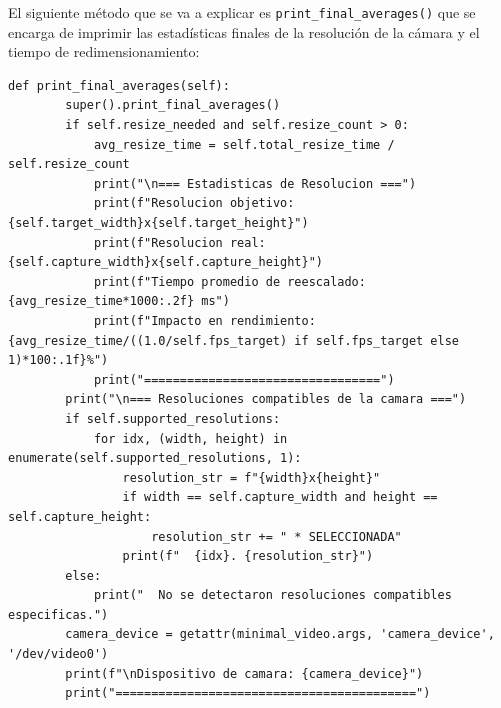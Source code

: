 El siguiente método que se va a explicar es \texttt{print\_final\_averages()} que se encarga de imprimir las estadísticas finales de la resolución de la cámara y el tiempo de redimensionamiento:
\begin{lstlisting}[style=pythonstyle, caption={Método \texttt{print\_final\_averages()} de \textit{Minimal\_Video\_Resolution\_verbose}.}, label={lst:print_final_averages}]
def print_final_averages(self):
        super().print_final_averages()
        if self.resize_needed and self.resize_count > 0:
            avg_resize_time = self.total_resize_time / self.resize_count
            print("\n=== Estadisticas de Resolucion ===")
            print(f"Resolucion objetivo: {self.target_width}x{self.target_height}")
            print(f"Resolucion real: {self.capture_width}x{self.capture_height}")
            print(f"Tiempo promedio de reescalado: {avg_resize_time*1000:.2f} ms")
            print(f"Impacto en rendimiento:        {avg_resize_time/((1.0/self.fps_target) if self.fps_target else 1)*100:.1f}%")
            print("=================================")
        print("\n=== Resoluciones compatibles de la camara ===")
        if self.supported_resolutions:
            for idx, (width, height) in enumerate(self.supported_resolutions, 1):
                resolution_str = f"{width}x{height}"
                if width == self.capture_width and height == self.capture_height:
                    resolution_str += " * SELECCIONADA"
                print(f"  {idx}. {resolution_str}")
        else:
            print("  No se detectaron resoluciones compatibles especificas.")
        camera_device = getattr(minimal_video.args, 'camera_device', '/dev/video0')
        print(f"\nDispositivo de camara: {camera_device}")
        print("==========================================")
\end{lstlisting}
\vspace{\baselineskip}

